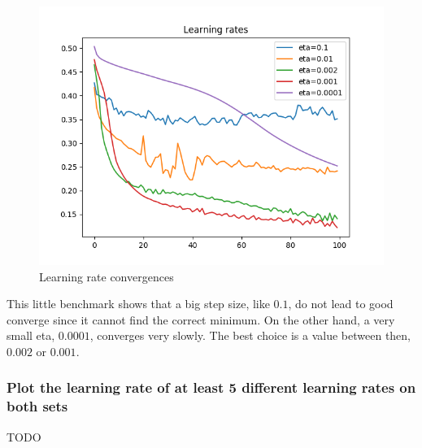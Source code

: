 \documentclass[11pt]{article}
\begin{document}
\begin{figure}[H]
\centering
\label{fig: learning_rate_convergence}
\includegraphics[scale=0.5]{images/NN_eta_vs_training}
\caption{Learning rate convergences}
\end{figure}

This little benchmark shows that a big step size, like $0.1$, do not lead to good converge since it cannot find the correct minimum. On the other hand, a very small eta, $0.0001$, converges very slowly. The best choice is a value between then, $0.002$ or $0.001$.
\subsubsection{Plot the learning rate of at least 5 different learning rates on both sets}
TODO
\end{document}
